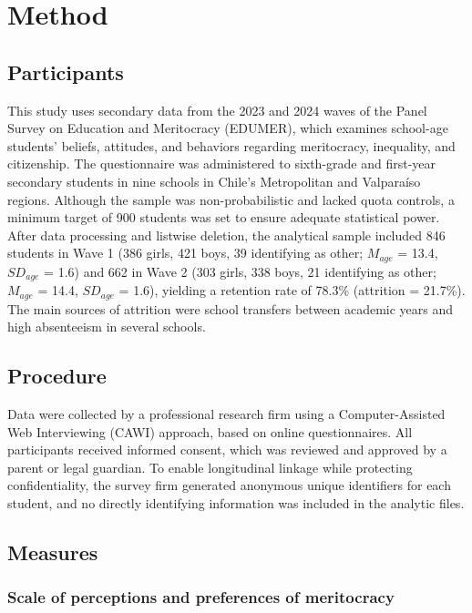 \documentclass[
  13pt,
]{article}
\begin{document}
\section{Method}\label{method}

\subsection{Participants}\label{participants}

This study uses secondary data from the 2023 and 2024 waves of the Panel
Survey on Education and Meritocracy (EDUMER), which examines school-age
students' beliefs, attitudes, and behaviors regarding meritocracy,
inequality, and citizenship. The questionnaire was administered to
sixth-grade and first-year secondary students in nine schools in Chile's
Metropolitan and Valparaíso regions. Although the sample was
non-probabilistic and lacked quota controls, a minimum target of 900
students was set to ensure adequate statistical power. After data
processing and listwise deletion, the analytical sample included 846
students in Wave 1 (386 girls, 421 boys, 39 identifying as other;
\(M_{age}\) = 13.4, \(SD_{age}\) = 1.6) and 662 in Wave 2 (303 girls,
338 boys, 21 identifying as other; \(M_{age}\) = 14.4, \(SD_{age}\) =
1.6), yielding a retention rate of 78.3\% (attrition = 21.7\%). The main
sources of attrition were school transfers between academic years and
high absenteeism in several schools.

\subsection{Procedure}\label{procedure}

Data were collected by a professional research firm using a
Computer-Assisted Web Interviewing (CAWI) approach, based on online
questionnaires. All participants received informed consent, which was
reviewed and approved by a parent or legal guardian. To enable
longitudinal linkage while protecting confidentiality, the survey firm
generated anonymous unique identifiers for each student, and no directly
identifying information was included in the analytic files.

\subsection{Measures}\label{measures}

\subsubsection{Scale of perceptions and preferences of
meritocracy}\label{scale-of-perceptions-and-preferences-of-meritocracy}
\end{document}
